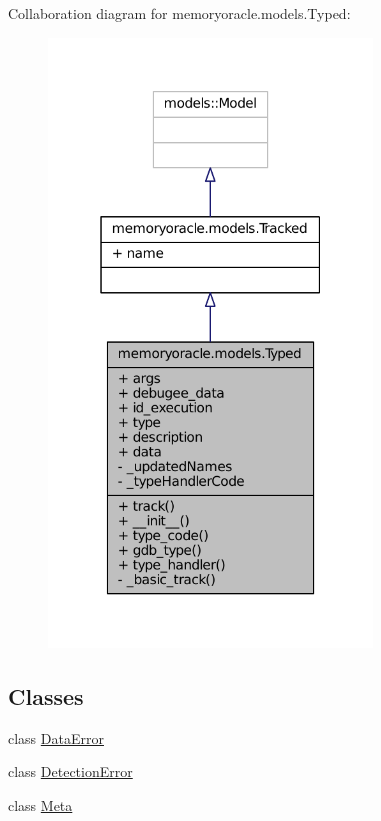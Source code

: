 Collaboration diagram for memoryoracle.\+models.\+Typed\+:\nopagebreak
\begin{figure}[H]
\begin{center}
\leavevmode
\includegraphics[width=244pt]{classmemoryoracle_1_1models_1_1Typed__coll__graph}
\end{center}
\end{figure}
\subsection*{Classes}
\begin{DoxyCompactItemize}
\item 
class \hyperlink{classmemoryoracle_1_1models_1_1Typed_1_1DataError}{Data\+Error}
\item 
class \hyperlink{classmemoryoracle_1_1models_1_1Typed_1_1DetectionError}{Detection\+Error}
\item 
class \hyperlink{classmemoryoracle_1_1models_1_1Typed_1_1Meta}{Meta}
\end{DoxyCompactItemize}
